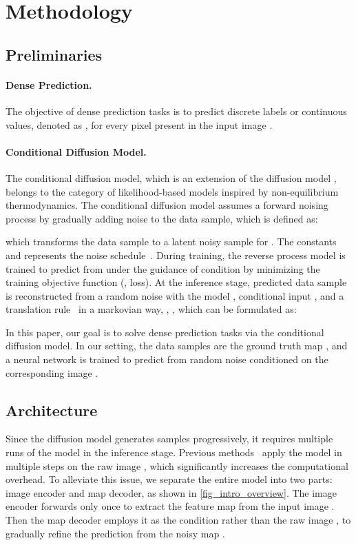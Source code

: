 \documentclass[10pt,twocolumn,letterpaper]{article}
\begin{document}
 \section{Methodology}
\subsection{Preliminaries}

\paragraph{Dense Prediction.} The objective of dense prediction tasks is to predict discrete labels or continuous values, denoted as , for every pixel present in the input image .


\paragraph{Conditional Diffusion Model.}
The conditional diffusion model, which is an extension of the diffusion model \cite{ho2020denoising,sohl2015deep,song2020improved}, belongs to the category of likelihood-based models inspired by non-equilibrium thermodynamics.
The conditional diffusion model assumes a forward noising process by gradually adding noise to the data sample, which is defined as:

which transforms the data sample  to a latent noisy sample  for . The constants   and  represents the noise schedule~\cite{nichol2021improved,ho2020denoising}.
During training, the reverse process model  is trained to predict  from  under the guidance of condition  by minimizing the training objective function (\ie,  loss).
At the inference stage, predicted data sample  is reconstructed from a random noise  with the model , conditional input , and a translation rule~\cite{ho2020denoising,song2020denoising} in a markovian way, \ie, , which can be formulated as:

In this paper, our goal is to solve dense prediction tasks via the conditional diffusion model.
In our setting, the data samples are the ground truth map , and a neural network  is trained to predict  from random noise  conditioned on the corresponding image .

\subsection{Architecture}
Since the diffusion model generates samples progressively, it requires multiple runs of the model in the inference stage.
Previous methods~\cite{wu2022medsegdiff,saxena2023depthgen, wolleb2022diffusion} apply the model  in multiple steps on the raw image , which significantly increases the computational overhead.
To alleviate this issue, we separate the entire model into two parts: image encoder and map decoder, as shown in \cref{fig_intro_overview}.
The image encoder forwards only once to extract the feature map from the input image . Then the map decoder employs it as the condition rather than the raw image , to gradually refine the prediction from the noisy map .
\end{document}
